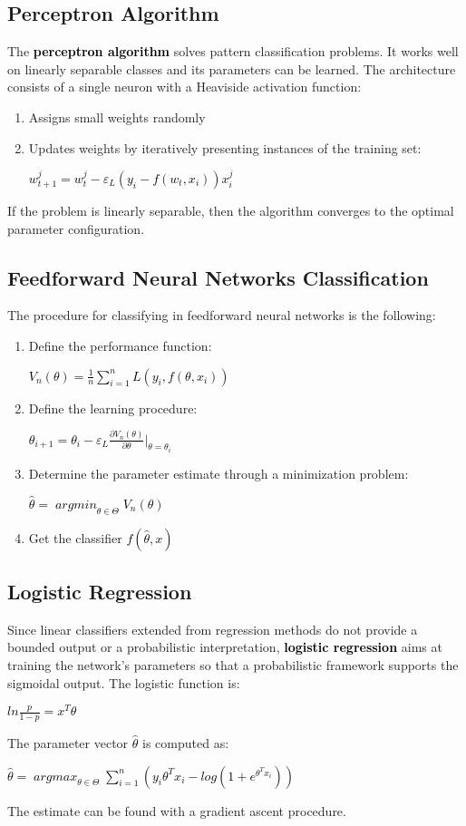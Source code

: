 \documentclass{article}
\DeclareMathOperator*{\argmin}{\textit{argmin}}
\DeclareMathOperator*{\argmax}{\textit{argmax}}
\newcommand{\bb}[1]{\textcolor{black}{\textbf{#1}}}
\newcommand{\rr}[1]{\textcolor{black}{#1}}
\newcommand{\cc}[1]{\begin{center}\textcolor{black}{#1}\end{center}}
\begin{document}
\subsection{Perceptron Algorithm}
The \bb{perceptron algorithm} solves pattern classification problems. It works well on linearly separable classes and its parameters can be learned. The architecture consists of a single neuron with a Heaviside activation function:
\begin{enumerate}
    \item Assigns small weights randomly
    \item Updates weights by iteratively presenting instances of the training set:
        \cc{$w^j_{t+1} = w^j_t-\varepsilon_L(y_i - f(w_t,x_i))x_i^j$}
\end{enumerate}
If the problem is linearly separable, then the algorithm converges to the optimal parameter configuration.

\subsection{Feedforward Neural Networks Classification}
The procedure for classifying in feedforward neural networks is the following:
\begin{enumerate}
    \item Define the performance function:
        \cc{$V_n(\theta)=\displaystyle\frac{1}{n}\displaystyle\sum^n_{i=1}L(y_i,f(\theta,x_i))$}
    \item Define the learning procedure:
        \cc{$\theta_{i+1}=\theta_i-\varepsilon_L\displaystyle\frac{\partial V_n(\theta)}{\partial \theta}|_{\theta=\theta_i}$}
    \item Determine the parameter estimate through a minimization problem:
        \cc{$\hat{\theta} = \displaystyle\argmin_{\theta\in\Theta}V_n(\theta)$}
    \item Get the classifier \rr{$f(\hat{\theta},x)$}
\end{enumerate}

\subsection{Logistic Regression}
Since linear classifiers extended from regression methods do not provide a bounded output or a probabilistic interpretation, \bb{logistic regression} aims at training the network’s parameters so that a probabilistic framework supports the sigmoidal output. The logistic function is:
\cc{$ln\displaystyle\frac{p}{1-p}= x^T\theta$}
The parameter vector \rr{$\hat{\theta}$} is computed as:
\cc{$\hat{\theta}=\displaystyle\argmax_{\theta\in\Theta}\displaystyle\sum^n_{i=1}(y_i\theta^Tx_i - log(1 + e^{\theta^Tx_i}))$}
The estimate can be found with a gradient ascent procedure.
\end{document}
